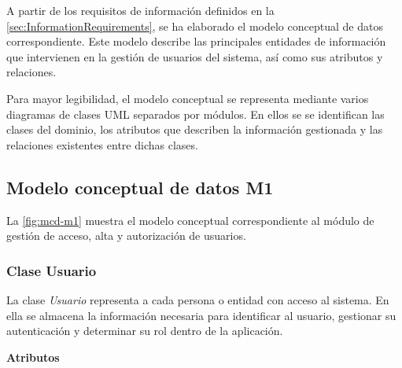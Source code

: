 A partir de los requisitos de información definidos en la \autoref{sec:InformationRequirements}, se ha
elaborado el modelo conceptual de datos correspondiente. Este modelo describe las principales entidades de información que intervienen en la gestión de
usuarios del sistema, así como sus atributos y relaciones.

Para mayor legibilidad, el modelo conceptual se representa mediante varios diagramas de clases UML separados por módulos. En ellos se se identifican las clases del dominio, los atributos que describen la información gestionada y las relaciones existentes entre dichas clases.

\subsection{Modelo conceptual de datos M1}
La \autoref{fig:mcd-m1} muestra el modelo conceptual correspondiente al módulo de gestión de acceso, alta y autorización de usuarios.


\subsubsection{Clase Usuario}

La clase \textit{Usuario} representa a cada persona o entidad con acceso al sistema. En ella se almacena la información necesaria para identificar al usuario, gestionar su autenticación y determinar su rol dentro de la aplicación.

\textbf{Atributos}

